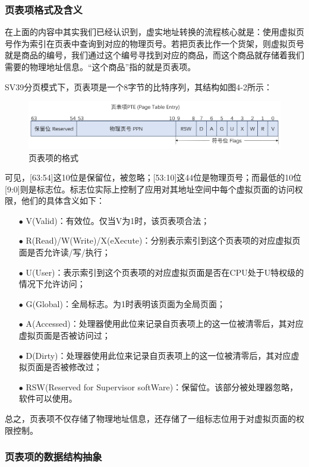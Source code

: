 \subsubsection{页表项格式及含义}

在上面的内容中其实我们已经认识到，虚实地址转换的流程核心就是：使用虚拟页号作为索引在页表中查询到对应的物理页号。若把页表比作一个货架，则虚拟页号就是商品的编号，我们通过这个编号寻找到对应的商品，而这个商品就存储着我们需要的物理地址信息。“这个商品”指的就是页表项。

SV39分页模式下，页表项是一个8字节的比特序列，其结构如图4-2所示：

\begin{figure}[h]
	\centering
	\includegraphics[width=.80\textwidth]{figures/04-01-页表项的格式.png}
	\caption{页表项的格式}
\end{figure}\FloatBarrier

可见，[63:54]这10位是保留位，被忽略；[53:10]这44位是物理页号；而最低的10位[9:0]则是标志位。标志位实际上控制了应用对其地址空间中每个虚拟页面的访问权限，他们的具体含义如下：

\begin{itemize}
	\item [$\bullet$]
	V(Valid)：有效位。仅当V为1时，该页表项合法；
	\item [$\bullet$]
	R(Read)/W(Write)/X(eXecute)：分别表示索引到这个页表项的对应虚拟页面是否允许读/写/执行；
	\item [$\bullet$]
	U(User)：表示索引到这个页表项的对应虚拟页面是否在CPU处于U特权级的情况下允许访问；
	\item [$\bullet$]
	G(Global)：全局标志。为1时表明该页面为全局页面；
	\item [$\bullet$]
	A(Accessed)：处理器使用此位来记录自页表项上的这一位被清零后，其对应虚拟页面是否被访问过；
	\item [$\bullet$]
	D(Dirty)：处理器使用此位来记录自页表项上的这一位被清零后，其对应虚拟页面是否被修改过；
	\item [$\bullet$]
	RSW(Reserved for Supervisor softWare)：保留位。该部分被处理器忽略，软件可以使用。	
\end{itemize}

总之，页表项不仅存储了物理地址信息，还存储了一组标志位用于对虚拟页面的权限控制。

\subsubsection{页表项的数据结构抽象}


